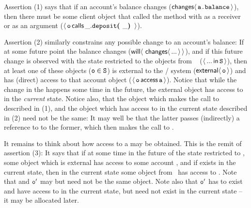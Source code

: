  
Assertion (1) %
says that if   an account's balance changes
($\Changes{\prg{a.balance}}$),
then there must be some client object 
that %
called the  method with  as a receiver or as an argument 
($\Calls{\prg{o}} {\prg{deposit}} {\_} {\_}$).
 
Assertion (2) similarly constrains any possible change to an 
account's balance: 
If at some future point the balance changes  (${\Future{\,\Changes{...}}}$),  %
and if this future change is observed with the state restricted to the objects from \SF~ (\ie $\Using{...}{\prg{S}}$), then 
at least one of these objects ($\prg{o}\in\SF$) is external to the / system ($\External{\prg{o}}$) and 
has (direct) access to that account object
($\CanAccess{\prg{o}}{\prg{a}}$).
Notice that while the change in the  happens some time in the future,
the external object  has access to  in the \emph{current} state.
Notice also, that the object which makes the call to  described in (1), and the object which 
has access to  in the current state described in (2) need not be the same: It may well be that the
latter passes (indirectly) a reference to  to the former, which then   makes the call
to .

It remains to think about how access to a  may be obtained. This is the remit of assertion (3): 
It says that if at some time in the future of the state restricted to \SF, 
some object  which is external has access to some account , and if  exists in the 
current state, then in the current state some object 
from \SF~has access to . Note that  and $\prg{o}'$ may but need not be the same object. Note also
that $\prg{o}'$ has to exist and have access to  in the current state, but 
 need not exist in the current state -- it may be allocated later.

\vspace{.1cm}

